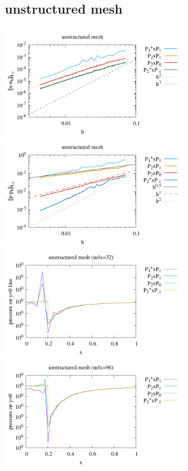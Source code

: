\subsection*{unstructured mesh}

\begin{center}
\includegraphics[width=8cm]{python_codes/fieldstone_120/paperresults/solvi_unstructured_errorsV.pdf}
\includegraphics[width=8cm]{python_codes/fieldstone_120/paperresults/solvi_unstructured_errorsP.pdf}\\
\includegraphics[width=8cm]{python_codes/fieldstone_120/paperresults/solvi_p_profile_unstructured_32.pdf}
\includegraphics[width=8cm]{python_codes/fieldstone_120/paperresults/solvi_p_profile_unstructured_96.pdf}
\end{center}

